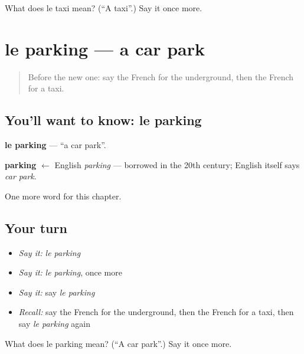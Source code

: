 \begin{tcolorbox}[breakable,colback=teal!4,colframe=teal!35!black,title={Before you move on}]
What does le taxi mean? (\textquotedblleft{}A taxi\textquotedblright{}.) Say it once more.
\end{tcolorbox}
\section[le parking]{le parking — a car park}

\label{lesson:FR-C106-parking}



\begin{quote}
Before the new one: say the French for the underground, then the French for a taxi.
\end{quote}

\subsection*{You'll want to know: le parking}
\textbf{le parking} — \textquotedblleft{}a car park\textquotedblright{}.

\begin{cousinweb}
\textbf{parking} $\leftarrow$ English \emph{parking} — borrowed in the 20th century; English itself says \emph{car park}.
\end{cousinweb}

\begin{grammarlens}[title={What you've built}]
One more word for this chapter.
\end{grammarlens}

\subsection*{Your turn}
\begin{itemize}
\raggedright
  \item \emph{Say it:} \emph{le parking}
  \item \emph{Say it:} \emph{le parking}, once more
  \item \emph{Say it:} say \emph{le parking}
  \item \emph{Recall:} say the French for the underground, then the French for a taxi, then say \emph{le parking} again
\end{itemize}

\begin{tcolorbox}[breakable,colback=teal!4,colframe=teal!35!black,title={Before you move on}]
What does le parking mean? (\textquotedblleft{}A car park\textquotedblright{}.) Say it once more.
\end{tcolorbox}
